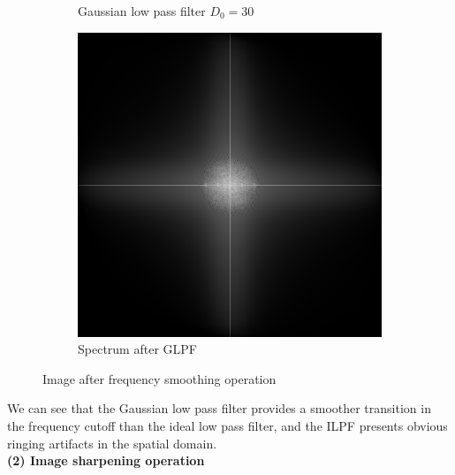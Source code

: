 \documentclass[UTF8]{ctexart}
\begin{document}
\begin{figure}[htbp]
\begin{subfigure}{0.3\textwidth}
        \caption{Gaussian low pass filter $D_0 = 30$}
    \end{subfigure}%
    \hfill
    \begin{subfigure}{0.3\textwidth}
        \centering
        \includegraphics[width=\linewidth]{pattern_glpf_spectrum.png}
        \caption{Spectrum after GLPF}
    \end{subfigure}%

    \caption{Image after frequency smoothing operation}
\end{figure}

We can see that the Gaussian low pass filter provides a smoother transition in the frequency cutoff than the ideal low pass filter,
and the ILPF presents obvious ringing artifacts in the spatial domain.\\

\textbf{\large (2) Image sharpening operation}
\end{document}
